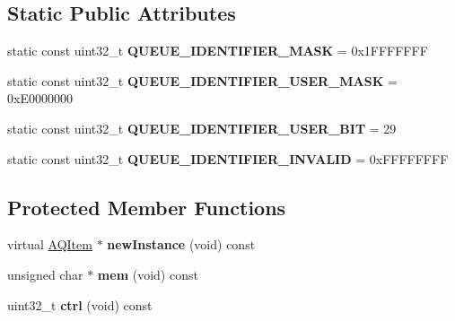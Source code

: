 \subsection*{Static Public Attributes}
\begin{DoxyCompactItemize}
\item 
static const uint32\+\_\+t {\bfseries Q\+U\+E\+U\+E\+\_\+\+I\+D\+E\+N\+T\+I\+F\+I\+E\+R\+\_\+\+M\+A\+SK} = 0x1\+F\+F\+F\+F\+F\+FF\hypertarget{class_a_q_item_aaa5f97ad56a729c0ae1e8687111a9a40}{}\label{class_a_q_item_aaa5f97ad56a729c0ae1e8687111a9a40}

\item 
static const uint32\+\_\+t {\bfseries Q\+U\+E\+U\+E\+\_\+\+I\+D\+E\+N\+T\+I\+F\+I\+E\+R\+\_\+\+U\+S\+E\+R\+\_\+\+M\+A\+SK} = 0x\+E0000000\hypertarget{class_a_q_item_a535cc166babbb9927ed075dc08eddaba}{}\label{class_a_q_item_a535cc166babbb9927ed075dc08eddaba}

\item 
static const uint32\+\_\+t {\bfseries Q\+U\+E\+U\+E\+\_\+\+I\+D\+E\+N\+T\+I\+F\+I\+E\+R\+\_\+\+U\+S\+E\+R\+\_\+\+B\+IT} = 29\hypertarget{class_a_q_item_a53a0322677680ab691ff049dc69a2aa1}{}\label{class_a_q_item_a53a0322677680ab691ff049dc69a2aa1}

\item 
static const uint32\+\_\+t {\bfseries Q\+U\+E\+U\+E\+\_\+\+I\+D\+E\+N\+T\+I\+F\+I\+E\+R\+\_\+\+I\+N\+V\+A\+L\+ID} = 0x\+F\+F\+F\+F\+F\+F\+FF\hypertarget{class_a_q_item_a987fe89fa76ce1733f1f8146873aead8}{}\label{class_a_q_item_a987fe89fa76ce1733f1f8146873aead8}

\end{DoxyCompactItemize}
\subsection*{Protected Member Functions}
\begin{DoxyCompactItemize}
\item 
virtual \hyperlink{class_a_q_item}{A\+Q\+Item} $\ast$ {\bfseries new\+Instance} (void) const \hypertarget{class_a_q_item_a998267c4e39d73e23e3740189f0ba884}{}\label{class_a_q_item_a998267c4e39d73e23e3740189f0ba884}

\item 
unsigned char $\ast$ {\bfseries mem} (void) const \hypertarget{class_a_q_item_ad66cddfab0d74ef3de890a915631d3b7}{}\label{class_a_q_item_ad66cddfab0d74ef3de890a915631d3b7}

\item 
uint32\+\_\+t {\bfseries ctrl} (void) const \hypertarget{class_a_q_item_a8815e7003fabbf8ab3462f8d570c0414}{}\label{class_a_q_item_a8815e7003fabbf8ab3462f8d570c0414}

\end{DoxyCompactItemize}
